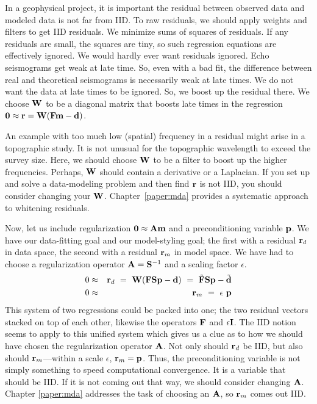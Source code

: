 \par
In a geophysical project,
it is important the residual between observed data and modeled data is not far from IID.
To raw residuals,
we should apply weights and filters to get IID residuals.
We minimize sums of squares of residuals.
If any residuals are small, the squares are tiny,
so such regression equations are effectively ignored.
We would hardly ever want residuals ignored.
Echo seismograms  get weak at late time.
So,
even with a bad fit,
the difference between real and theoretical seismograms
is necessarily weak at late times.
We do not want the data at late times to be ignored.
So,
we boost up the residual there.
We choose $\bold W$ to be a diagonal matrix that boosts late times
in the regression $\bold 0 \approx \bold r = \bold W(\bold F\bold m-\bold d)$.
\par
An example with too much low (spatial) frequency in a residual might arise in a topographic study.
It is not unusual for the topographic wavelength to exceed the survey size.
Here, we should choose $\bold W$ to be a filter to boost up the higher frequencies.
Perhaps, $\bold W$ should contain a derivative or a Laplacian.
If you set up and solve a data-modeling problem
and then find $\bold r$ is not IID,
you should consider changing your $\bold W$.
Chapter~\ref{paper:mda} provides a systematic
approach to whitening residuals.
\par
Now, let us include regularization $\bold 0 \approx\bold A\bold m$
and a preconditioning variable $\bold p$.
We have our data-fitting goal and our model-styling goal;
the first with a residual $\bold r_d$
in data space, the second with a residual $\bold r_m$
in model space.
We have had to choose a regularization operator $\bold A = \bold S^{-1}$ and a scaling factor $\epsilon$.
\begin{eqnarray}
\label{eqn:tworegressions}
0 & \approx & \bold r_d
\ = \ \bold W (\bold F  \bold S \bold p -       \bold d) 
\ = \ \tilde{  \bold F} \bold S \bold p -\tilde{\bold d} 
\\
0 & \approx& \bold r_m  \ = \ \epsilon \ \bold p
\end{eqnarray}
This system of two regressions could be packed into one;
the two residual vectors stacked on top of each other,
likewise the operators $\bold F$ and $\epsilon \bold I$.
The IID notion seems to apply to this unified system
which gives us a clue as to
how we should have chosen the regularization operator $\bold A$.
Not only should $\bold r_d$ be IID, but also should $\bold r_m$---within a scale $\epsilon$, $\bold r_m=\bold p$.
Thus, the preconditioning variable is not simply something to speed computational convergence.
It is a variable that should be IID.
If it is not coming out that way, we should consider changing $\bold A$.
Chapter \ref{paper:mda} addresses the task of choosing an $\bold A$,
so $\bold r_m$ comes out IID.
\par
{}


